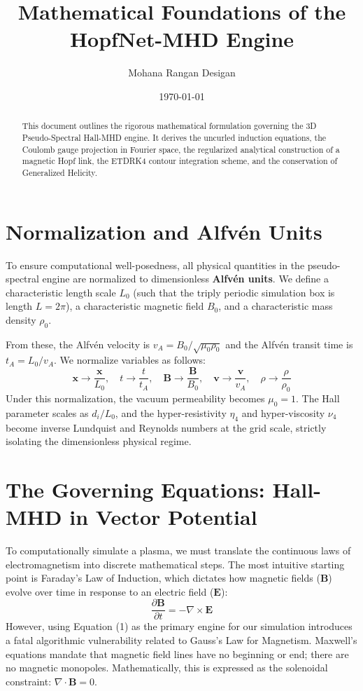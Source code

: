 \documentclass[11pt, a4paper]{article}
\title{\textbf{Mathematical Foundations of the HopfNet-MHD Engine}}
\author{Mohana Rangan Desigan}
\date{\today}
\begin{document}
\maketitle

\begin{abstract}
This document outlines the rigorous mathematical formulation governing the 3D Pseudo-Spectral Hall-MHD engine. It derives the uncurled induction equations, the Coulomb gauge projection in Fourier space, the regularized analytical construction of a magnetic Hopf link, the ETDRK4 contour integration scheme, and the conservation of Generalized Helicity.
\end{abstract}

\tableofcontents
\newpage
\section{Normalization and Alfvén Units}
\label{sec:units}
To ensure computational well-posedness, all physical quantities in the pseudo-spectral engine are normalized to dimensionless \textbf{Alfvén units}. We define a characteristic length scale $L_0$ (such that the triply periodic simulation box is length $L = 2\pi$), a characteristic magnetic field $B_0$, and a characteristic mass density $\rho_0$. 

From these, the Alfvén velocity is $v_A = B_0 / \sqrt{\mu_0 \rho_0}$ and the Alfvén transit time is $t_A = L_0 / v_A$. We normalize variables as follows:
\begin{equation}
    \mathbf{x} \to \frac{\mathbf{x}}{L_0}, \quad t \to \frac{t}{t_A}, \quad \mathbf{B} \to \frac{\mathbf{B}}{B_0}, \quad \mathbf{v} \to \frac{\mathbf{v}}{v_A}, \quad \rho \to \frac{\rho}{\rho_0}
\end{equation}
Under this normalization, the vacuum permeability becomes $\mu_0 = 1$. The Hall parameter scales as $d_i / L_0$, and the hyper-resistivity $\eta_4$ and hyper-viscosity $\nu_4$ become inverse Lundquist and Reynolds numbers at the grid scale, strictly isolating the dimensionless physical regime.

\section{The Governing Equations: Hall-MHD in Vector Potential}
\label{sec:equations}

To computationally simulate a plasma, we must translate the continuous laws of electromagnetism into discrete mathematical steps. The most intuitive starting point is Faraday's Law of Induction, which dictates how magnetic fields ($\mathbf{B}$) evolve over time in response to an electric field ($\mathbf{E}$):
\begin{equation}
    \frac{\partial \mathbf{B}}{\partial t} = -\nabla \times \mathbf{E}
\end{equation}
However, using Equation (1) as the primary engine for our simulation introduces a fatal algorithmic vulnerability related to Gauss's Law for Magnetism. Maxwell's equations mandate that magnetic field lines have no beginning or end; there are no magnetic monopoles. Mathematically, this is expressed as the solenoidal constraint: $\nabla \cdot \mathbf{B} = 0$. 
\end{document}
